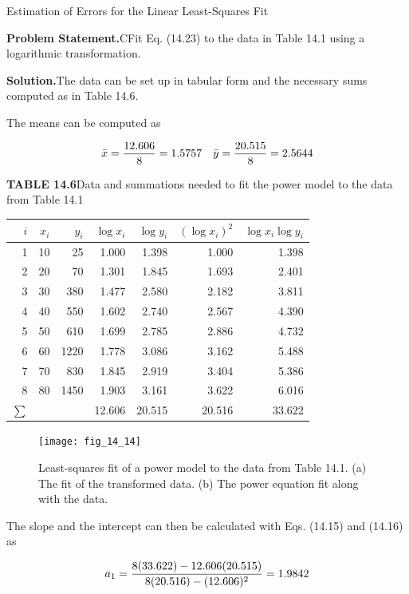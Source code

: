 \documentclass[../main.tex]{subfiles}
\begin{document}
\begin{example} Estimation of Errors for the Linear Least-Squares Fit

    \noindent\textbf{Problem Statement.}\quad CFit Eq. (14.23) to the data in Table 14.1 using a logarithmic transformation.

    \noindent\textbf{Solution.}\quad  The data can be set up in tabular form and the necessary sums computed as in Table 14.6.

	The means can be computed as
	
	\begin{equation}
		\notag
		\bar{x} = \frac{12.606}{8}=1.5757 \quad \bar{y} = \frac{20.515}{8} = 2.5644
	\end{equation}

	\noindent\textbf{TABLE 14.6}\quad Data and summations needed to fit the power model to the data from
	Table 14.1

	\begin{tabular}{rrrrrrr}
		$i$ & $x_i$ & $y_i$ & $\log x_i$ & $\log y_i$ & $(\log x_i )^2$ & $\log x_i \log y_i$ \\
		\hline
		1 & 10 & 25 & 1.000 & 1.398 & 1.000 & 1.398 \\
		2 & 20 & 70 & 1.301 & 1.845 & 1.693 & 2.401 \\
		3 & 30 & 380 & 1.477 & 2.580 & 2.182 & 3.811 \\
		4 & 40 & 550 & 1.602 & 2.740 & 2.567 & 4.390 \\
		5 & 50 & 610 & 1.699 & 2.785 & 2.886 & 4.732 \\
		6 & 60 & 1220 & 1.778 & 3.086 & 3.162 & 5.488 \\
		7 & 70 & 830 & 1.845 & 2.919 & 3.404 & 5.386 \\
		8 & 80 & 1450 & 1.903 & 3.161 & 3.622 & 6.016 \\
		$\sum$ &&&12.606 & 20.515 & 20.516 & 33.622

	\end{tabular}

	\begin{figure}[H]
		\centering
		\texttt{[image: fig\_14\_14]}
		\caption{\textsf{Least-squares fit of a power model to the data from Table 14.1. (a) The fit of the transformed data.
		(b) The power equation fit along with the data.}}
		\label{fig:fig_14_14}
	\end{figure}

	\noindent The slope and the intercept can then be calculated with Eqs. (14.15) and (14.16) as

	\begin{equation}
		\notag
		a_1 = \frac{8(33.622) - 12.606(20.515)}{8(20.516) - (12.606)^2} = 1.9842
	\end{equation}


\end{example}
\end{document}

